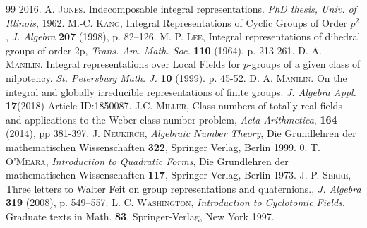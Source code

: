 \documentclass{article}
\theoremstyle{definition}
\theoremstyle{remark}
\begin{document}
\begin{thebibliography}{99}
    2016.
     \textsc{A. Jones}. Indecomposable integral representations. 
     \textit{PhD thesis, Univ. of Illinois}, 1962.
    \textsc{M.-C. Kang}, Integral Representations of Cyclic Groups of Order $p^2$, \textit{J. Algebra} \textbf{207} (1998), p. 82–126.
     \textsc{M. P. Lee}, Integral representations of dihedral groups of 
     order 2p, \textit{Trans. Am. Math. Soc.} \textbf{110} (1964), 
     p. 213-261.
     \textsc{D. A. Manilin}. Integral representations over Local Fields
     for $p$-groups of a given class of
     nilpotency. \textit{St. Petersburg 
     Math. J.} \textbf{10} (1999). p. 45-52.
     \textsc{D. A. Manilin}. On the integral
     and globally irreducible representations 
     of finite groups. \textit{J. Algebra 
     Appl.} \textbf{17}(2018) Article 
     ID:1850087.
    \textsc{J.C. Miller},
    Class numbers of totally real fields and applications to the 
    Weber class number problem,
    \textit{Acta Arithmetica}, \textbf{164} (2014), 
    pp 381-397.
     \textsc{J. Neukirch}, \textit{Algebraic Number Theory},
     Die Grundlehren der mathematischen Wissenschaften \textbf{322},
     Springer Verlag, Berlin 1999.
     \textsc{0. T. O'Meara}, \textit{Introduction to Quadratic Forms}, 
     Die Grundlehren der mathematischen Wissenschaften \textbf{117},
     Springer-Verlag, Berlin 1973.
     \textsc{J.-P. Serre}, Three letters to Walter Feit on group representations and quaternions., \textit{J. Algebra} \textbf{319}
     (2008), p. 549–557.
    \textsc{L. C. Washington}, 
    \textit{Introduction to Cyclotomic Fields}, Graduate texts in Math. 
    \textbf{83}, Springer-Verlag, New York 1997.
\end{thebibliography}
\end{document}
